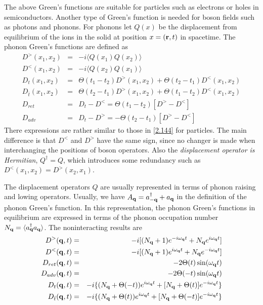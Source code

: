 The above Green's functions are suitable for particles such as electrons or holes in semiconductors.
Another type of Green's function is needed for boson fields such as photons and phonons.
For phonons let $Q(x)$ be the displacement from equilibrium of the ions in the solid at position $x=(\mathbf{r},t)$ in spacetime.
The phonon Green's functions are defined as
\begin{eqnarray}
  D^>(x_1,x_2) &=& -i \langle Q(x_1) Q(x_2) \rangle \nonumber \\
  D^<(x_1,x_2) &=& -i \langle Q(x_2) Q(x_1) \rangle \nonumber \\
  D_t(x_1,x_2) &=& \Theta(t_1-t_2) D^>(x_1,x_2) + \Theta(t_2-t_1) D^<(x_1,x_2) \nonumber \\
  D_{\bar{t}} (x_1,x_2) &=& \Theta(t_2-t_1) D^>(x_1,x_2) + \Theta(t_1-t_2) D^<(x_1,x_2) \nonumber \\
  D_{ret} &=& D_t-D^< = \Theta(t_1-t_2) [D^>-D^<] \nonumber \\
  D_{adv} &=& D_t-D^> = -\Theta(t_2-t_1) [D^> -D^<] \label{2.150}
\end{eqnarray}
There expressions are rather similar to those in \eqref{2.144} for particles.
The main difference is that $D^<$ and $D^>$ have the same sign, since no changer is made when interchanging the positions of boson operators.
Also the \textit{displacement operator is Hermitian}, $Q^\dagger = Q$, which introduces some redundancy such as $D^<(x_1,x_2) = D^>(x_2,x_1)$.

The displacement operators $Q$ are usually represented in terms of phonon raising and lowing operators.
Usually, we have $A_{\mathbf{q}} = a^\dagger_{-\mathbf{q}} + a_{\mathbf{q}}$  in the definition of the phonon Green's function.
In this representation, the phonon Green's functions in equilibrium are expressed in terms of the phonon occupation number $N_{\mathbf{q}} = \langle a^\dagger_{\mathbf{q}} a_{\mathbf{q}} \rangle$.
The noninteracting results are
\begin{eqnarray}
D^>(\mathbf{q},t) &=& -i[(N_{\mathbf{q}}+1)e^{-i\omega_{\mathbf{q}} t}+ N_{\mathbf{q}} e^{i\omega_{\mathbf{q}} t}]\nonumber \\
D^<(\mathbf{q},t) &=& -i[(N_{\mathbf{q}}+1)e^{i\omega_{\mathbf{q}} t} + N_{\mathbf{q}} e^{-i\omega_{\mathbf{q}} t}] \nonumber \\
D_{ret}(\mathbf{q},t) &=& -2\Theta(t) \sin(\omega_{\mathbf{q}} t) \nonumber\\
D_{adv}(\mathbf{q},t) &=& -2\Theta(-t) \sin(\omega_{\mathbf{q}} t) \\
D_t(\mathbf{q},t) &=& -i\lbrace(N_{\mathbf{q}} + \Theta(-t))e^{i\omega_{\mathbf{q}} t} + [N_{\mathbf{q}} + \Theta(t)] e^{-i\omega_{\mathbf{q}} t}\rbrace \nonumber\\
D_{\bar{t}}(\mathbf{q},t) &=& -i\lbrace(N_{\mathbf{q}} + \Theta(t))e^{i\omega_{\mathbf{q}} t} + [N_{\mathbf{q}} + \Theta(-t)] e^{-i\omega_{\mathbf{q}} t}\rbrace 	\nonumber\label{1.150}
\end{eqnarray}

